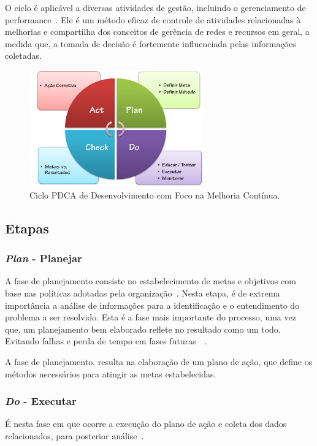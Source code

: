 O ciclo é aplicável a diversas atividades de gestão, incluindo o gerenciamento de performance~\cite{pdcacont}. Ele é um método eficaz de controle de atividades relacionadas à melhorias e compartilha dos conceitos de gerência de redes e recursos em geral, a medida que, a tomada de decisão é fortemente influenciada pelas informações coletadas.


\begin{figure}[htp]
\centering
\includegraphics[width=7.5cm]{chapters/chapter2/pdca_cycle.png}
\caption[Ciclo PDCA]{Ciclo PDCA de Desenvolvimento com Foco na Melhoria Contínua.}
\label{fig:pdca}
\end{figure}


\subsection{Etapas}
\label{pdca:phases}
\subsubsection{\textit{Plan} - Planejar}
A fase de planejamento consiste no estabelecimento de metas e objetivos com base nas políticas adotadas pela organização~\cite{pdcacont}. Nesta etapa, é de extrema importância a análise de informações para a identificação e o entendimento do problema a ser resolvido. Esta é a fase mais importante do processo, uma vez que, um planejamento bem elaborado reflete no resultado como um todo. Evitando falhas e perda de tempo em fases futuras~\cite{fabio2003}~\cite{pdcacont}.

A fase de planejamento, resulta na elaboração de um plano de ação, que define os métodos necessários para atingir as metas estabelecidas.

\subsubsection{\textit{Do} - Executar}
É nesta fase em que ocorre a execução do plano de ação e coleta dos dados relacionados, para posterior análise~\cite{pdcacont}.

